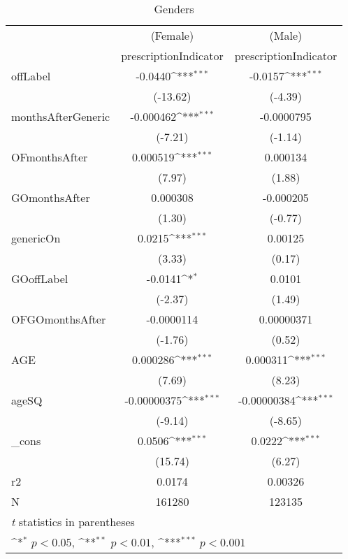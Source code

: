 \begin{table}[htbp]\centering
\def\sym#1{\ifmmode^{#1}\else\(^{#1}\)\fi}
\caption{Genders\label{tab1}}
\begin{tabular}{l*{2}{c}}
\hline\hline
            &\multicolumn{1}{c}{(Female)}&\multicolumn{1}{c}{(Male)}\\
            &\multicolumn{1}{c}{prescriptionIndicator}&\multicolumn{1}{c}{prescriptionIndicator}\\
\hline
offLabel    &     -0.0440\sym{***}&     -0.0157\sym{***}\\
            &    (-13.62)         &     (-4.39)         \\
[1em]
monthsAfterGeneric&   -0.000462\sym{***}&  -0.0000795         \\
            &     (-7.21)         &     (-1.14)         \\
[1em]
OFmonthsAfter&    0.000519\sym{***}&    0.000134         \\
            &      (7.97)         &      (1.88)         \\
[1em]
GOmonthsAfter&    0.000308         &   -0.000205         \\
            &      (1.30)         &     (-0.77)         \\
[1em]
genericOn   &      0.0215\sym{***}&     0.00125         \\
            &      (3.33)         &      (0.17)         \\
[1em]
GOoffLabel  &     -0.0141\sym{*}  &      0.0101         \\
            &     (-2.37)         &      (1.49)         \\
[1em]
OFGOmonthsAfter&  -0.0000114         &  0.00000371         \\
            &     (-1.76)         &      (0.52)         \\
[1em]
AGE         &    0.000286\sym{***}&    0.000311\sym{***}\\
            &      (7.69)         &      (8.23)         \\
[1em]
ageSQ       & -0.00000375\sym{***}& -0.00000384\sym{***}\\
            &     (-9.14)         &     (-8.65)         \\
[1em]
\_cons      &      0.0506\sym{***}&      0.0222\sym{***}\\
            &     (15.74)         &      (6.27)         \\
\hline
r2          &      0.0174         &     0.00326         \\
N           &      161280         &      123135         \\
\hline\hline
\multicolumn{3}{l}{\footnotesize \textit{t} statistics in parentheses}\\
\multicolumn{3}{l}{\footnotesize \sym{*} \(p<0.05\), \sym{**} \(p<0.01\), \sym{***} \(p<0.001\)}\\
\end{tabular}
\end{table}
